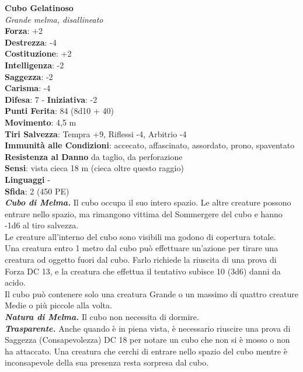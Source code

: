 \begin{multicols}{2}
\medskip\textbf{Cubo Gelatinoso}\\
\emph{Grande melma, disallineato}\\
\textbf{Forza}: +2\\
\textbf{Destrezza}: -4\\
\textbf{Costituzione}: +2\\
\textbf{Intelligenza}: -2\\
\textbf{Saggezza}: -2\\
\textbf{Carisma}: -4\\
\textbf{Difesa}: 7 - \textbf{Iniziativa}: -2\\
\textbf{Punti Ferita}: 84 (8d10 + 40)\\
\textbf{Movimento}: 4,5 m\\
\textbf{Tiri Salvezza}: Tempra +9, Riflessi -4, Arbitrio -4\\
\textbf{Immunità alle Condizioni}: accecato, affascinato, assordato, prono, spaventato\\
\textbf{Resistenza al Danno} da taglio, da perforazione\\
\textbf{Sensi}: vista cieca 18 m (cieca oltre questo raggio)\\
\textbf{Linguaggi} -\\
\textbf{Sfida}: 2 (450 PE)\smallskip\\
\emph{\textbf{Cubo di Melma.}} Il cubo occupa il suo intero spazio. Le altre creature possono entrare nello spazio, ma rimangono vittima del Sommergere del cubo e hanno -1d6 al tiro salvezza.\\

Le creature all'interno del cubo sono visibili ma godono di copertura totale.\\

Una creatura entro 1 metro dal cubo può effettuare un'azione per tirare una creatura od oggetto fuori dal cubo. Farlo richiede la riuscita di una prova di Forza DC  13, e la creatura che effettua il tentativo subisce 10 (3d6) danni da acido.\\

Il cubo può contenere solo una creatura Grande o un massimo di quattro creature Medie o più piccole alla volta.\\

\emph{\textbf{Natura di Melma.}} Il cubo non necessita di dormire.\\

\emph{\textbf{Trasparente.}} Anche quando è in piena vista, è necessario riuscire una prova di Saggezza (Consapevolezza) DC  18 per notare un cubo che non si è mosso o non ha attaccato. Una creatura che cerchi di entrare nello spazio del cubo mentre è inconsapevole della sua presenza resta sorpresa dal cubo.\\


\end{multicols}
